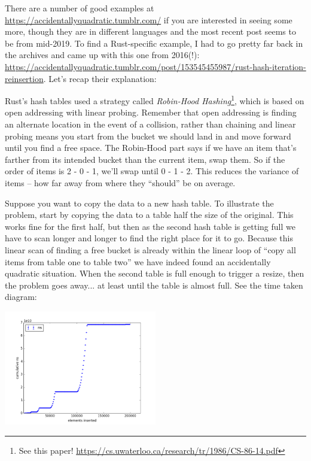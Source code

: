 There are a number of good examples at \url{https://accidentallyquadratic.tumblr.com/} if you are interested in seeing some more, though they are in different languages and the most recent post seems to be from mid-2019. To find a Rust-specific example, I had to go pretty far back in the archives and came up with this one from 2016(!): \url{https://accidentallyquadratic.tumblr.com/post/153545455987/rust-hash-iteration-reinsertion}. Let's recap their explanation:

Rust's hash tables used a strategy called \textit{Robin-Hood Hashing}\footnote{See this paper! \url{https://cs.uwaterloo.ca/research/tr/1986/CS-86-14.pdf}}, which is based on open addressing with linear probing. Remember that open addressing is finding an alternate location in the event of a collision, rather than chaining and linear probing means you start from the bucket we should land in and move forward until you find a free space. The Robin-Hood part says if we have an item that's farther from its intended bucket than the current item, swap them. So if the order of items is 2 - 0 - 1, we'll swap until 0 - 1 - 2. This reduces the variance of items -- how far away from where they ``should'' be on average.

Suppose you want to copy the data to a new hash table. To illustrate the problem, start by copying the data to a table half the size of the original. This works fine for the first half, but then as the second hash table is getting full we have to scan longer and longer to find the right place for it to go. Because this linear scan of finding a free bucket is already within the linear loop of ``copy all items from table one to table two'' we have indeed found an accidentally quadratic situation. When the second table is full enough to trigger a resize, then the problem goes away... at least until the table is almost full. See the time taken diagram:

\begin{center}
  \includegraphics[width=0.5\textwidth]{images/robinhoodhashing.png}
\end{center}


